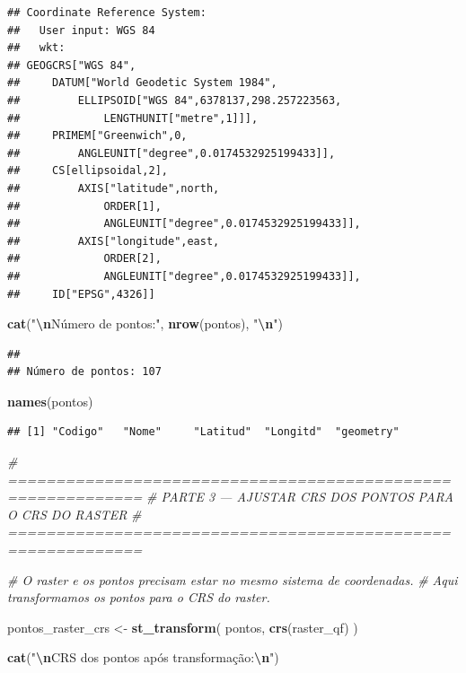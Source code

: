 \documentclass[
]{article}
\newenvironment{Shaded}{\begin{snugshade}}{\end{snugshade}}
\newcommand{\CommentTok}[1]{\textcolor[rgb]{0.56,0.35,0.01}{\textit{#1}}}
\newcommand{\FunctionTok}[1]{\textcolor[rgb]{0.13,0.29,0.53}{\textbf{#1}}}
\newcommand{\NormalTok}[1]{#1}
\newcommand{\OtherTok}[1]{\textcolor[rgb]{0.56,0.35,0.01}{#1}}
\newcommand{\SpecialCharTok}[1]{\textcolor[rgb]{0.81,0.36,0.00}{\textbf{#1}}}
\newcommand{\StringTok}[1]{\textcolor[rgb]{0.31,0.60,0.02}{#1}}
\begin{document}
\begin{verbatim}
## Coordinate Reference System:
##   User input: WGS 84 
##   wkt:
## GEOGCRS["WGS 84",
##     DATUM["World Geodetic System 1984",
##         ELLIPSOID["WGS 84",6378137,298.257223563,
##             LENGTHUNIT["metre",1]]],
##     PRIMEM["Greenwich",0,
##         ANGLEUNIT["degree",0.0174532925199433]],
##     CS[ellipsoidal,2],
##         AXIS["latitude",north,
##             ORDER[1],
##             ANGLEUNIT["degree",0.0174532925199433]],
##         AXIS["longitude",east,
##             ORDER[2],
##             ANGLEUNIT["degree",0.0174532925199433]],
##     ID["EPSG",4326]]
\end{verbatim}

\begin{Shaded}
\begin{Highlighting}[]
\FunctionTok{cat}\NormalTok{(}\StringTok{"}\SpecialCharTok{\textbackslash{}n}\StringTok{Número de pontos:"}\NormalTok{, }\FunctionTok{nrow}\NormalTok{(pontos), }\StringTok{"}\SpecialCharTok{\textbackslash{}n}\StringTok{"}\NormalTok{)}
\end{Highlighting}
\end{Shaded}

\begin{verbatim}
## 
## Número de pontos: 107
\end{verbatim}

\begin{Shaded}
\begin{Highlighting}[]
\FunctionTok{names}\NormalTok{(pontos)}
\end{Highlighting}
\end{Shaded}

\begin{verbatim}
## [1] "Codigo"   "Nome"     "Latitud"  "Longitd"  "geometry"
\end{verbatim}

\begin{Shaded}
\begin{Highlighting}[]
\CommentTok{\# ============================================================}
\CommentTok{\# PARTE 3 — AJUSTAR CRS DOS PONTOS PARA O CRS DO RASTER}
\CommentTok{\# ============================================================}

\CommentTok{\# O raster e os pontos precisam estar no mesmo sistema de coordenadas.}
\CommentTok{\# Aqui transformamos os pontos para o CRS do raster.}

\NormalTok{pontos\_raster\_crs }\OtherTok{\textless{}{-}} \FunctionTok{st\_transform}\NormalTok{(}
\NormalTok{  pontos,}
  \FunctionTok{crs}\NormalTok{(raster\_qf)}
\NormalTok{)}

\FunctionTok{cat}\NormalTok{(}\StringTok{"}\SpecialCharTok{\textbackslash{}n}\StringTok{CRS dos pontos após transformação:}\SpecialCharTok{\textbackslash{}n}\StringTok{"}\NormalTok{)}
\end{Highlighting}
\end{Shaded}
\end{document}
